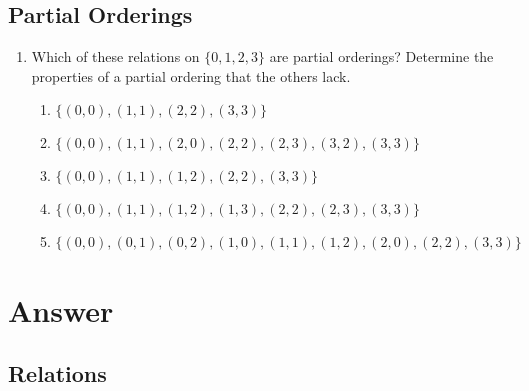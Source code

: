 \documentclass{sig-alternate-05-2015}
\begin{document}
\subsection{Partial Orderings}
\begin{enumerate}
\item Which of these relations on $\{0, 1, 2, 3\}$ are partial orderings? Determine the properties of a partial ordering that
the others lack.
\begin{enumerate}
	\item $\{(0, 0), (1, 1), (2, 2), (3, 3)\}$ 
	\item $\{(0, 0), (1, 1), (2, 0), (2, 2), (2, 3), (3, 2), (3, 3)\}$
	\item $\{(0, 0), (1, 1), (1, 2), (2, 2), (3, 3)\}$
	\item $\{(0, 0), (1, 1), (1, 2), (1, 3), (2, 2), (2, 3), (3, 3)\}$
	\item $\{(0, 0), (0, 1), (0, 2), (1, 0), (1, 1), (1, 2), (2, 0), (2, 2), (3, 3)\}$
\end{enumerate}
\end{enumerate}

\nocite{*}

 
\newpage
\appendix
\section{Answer}
\subsection{Relations}
\end{document}
